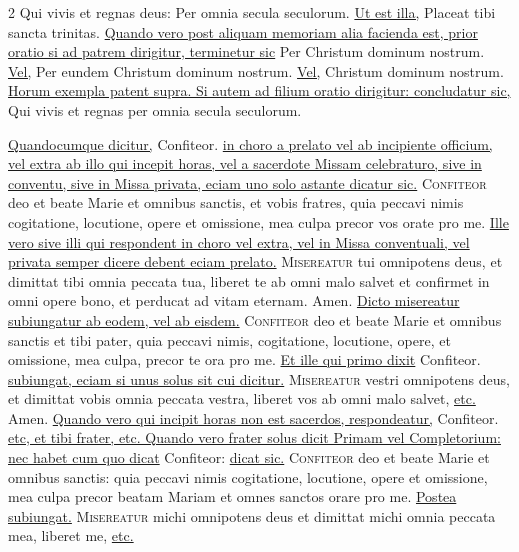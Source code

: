 \begin{multicols}{2}
\newline Qui vivis et regnas deus: Per omnia secula seculorum. \ul{Ut est illa,} Placeat tibi sancta trinitas.
\newline \ul{Quando vero post aliquam memoriam alia facienda est, prior oratio si ad patrem dirigitur, terminetur sic}
\newline Per Christum dominum nostrum. \ul{Vel,}
\newline Per eundem Christum dominum nostrum. \ul{Vel,}
\newline Christum dominum nostrum. \ul{Horum exempla patent supra. Si autem ad filium oratio dirigitur: concludatur sic,}
\newline Qui vivis et regnas per omnia secula seculorum.

{\color{Red} }
\newline \ul{Quandocumque dicitur,} Confiteor. \ul{in choro a prelato vel ab incipiente officium, vel extra ab illo qui incepit horas, vel a sacerdote Missam celebraturo, sive in conventu, sive in Missa privata, eciam uno solo astante dicatur sic.}
\lettrine[lines=2]{\zallmancaps \color{Blue} C}{onfiteor} deo et beate Marie et omnibus sanctis, et vobis fratres, quia peccavi nimis cogitatione, locutione, opere et omissione, mea culpa precor vos orate pro me.
\newline \ul{Ille vero sive illi qui respondent in choro vel extra, vel in Missa conventuali, vel privata semper dicere debent eciam prelato.}
\lettrine[lines=2]{\zallmancaps \color{Red} M}{isereatur} tui omnipotens deus, et dimittat tibi omnia peccata tua, liberet te ab omni malo salvet et confirmet in omni opere bono, et perducat ad vitam eternam. \R Amen.
\newline \ul{Dicto misereatur subiungatur ab eodem, vel ab eisdem.}
\lettrine[lines=2]{\zallmancaps \color{Blue} C}{onfiteor} deo et beate Marie et omnibus sanctis et tibi pater, quia peccavi nimis, cogitatione, locutione, opere, et omissione, mea culpa, precor te ora pro me.
\newline \ul{Et ille qui primo dixit} Confiteor. \ul{subiungat, eciam si unus solus sit cui dicitur.}
\lettrine[lines=2]{\zallmancaps \color{Red} M}{isereatur} vestri omnipotens deus, et dimittat vobis omnia peccata vestra, liberet vos ab omni malo salvet, \ul{etc.} \R Amen.
\newline \ul{Quando vero qui incipit horas non est sacerdos, respondeatur,} Confiteor. \ul{etc, et tibi frater, etc. Quando vero frater solus dicit Primam vel Completorium: nec habet cum quo dicat} Confiteor: \ul{dicat sic.}
\lettrine[lines=2]{\zallmancaps \color{Blue} C}{onfiteor} deo et beate Marie et omnibus sanctis: quia peccavi nimis cogitatione, locutione, opere et omissione, mea culpa precor beatam Mariam et omnes sanctos orare pro me. \ul{Postea subiungat.}
\lettrine[lines=2]{\zallmancaps \color{Red} M}{isereatur} michi omnipotens deus et dimittat michi omnia peccata mea, liberet me, \ul{etc.}


\end{multicols}
